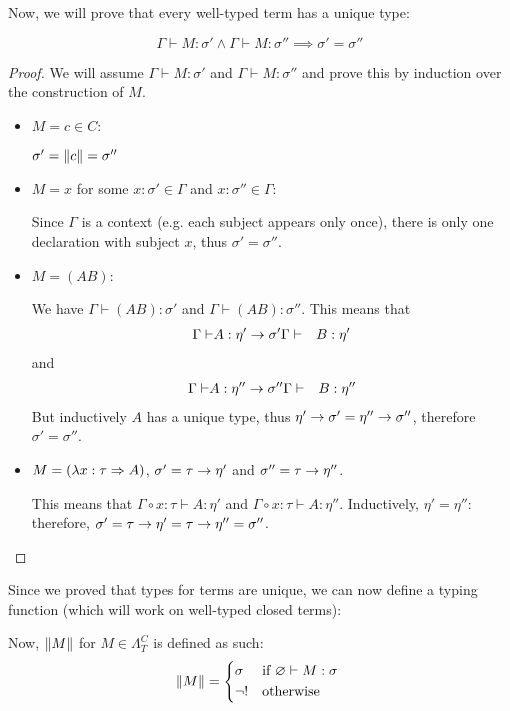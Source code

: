 \documentclass[main.tex]{subfiles}
\begin{document}
Now, we will prove that every well-typed term has a unique type:
\begin{prop}
    \label{prop:uniquetypespure}
    \[ \Gamma \vdash M : \sigma' \land \Gamma \vdash M : \sigma''
        \implies \sigma' = \sigma'' \]
\end{prop}
\begin{proof}
    We will assume $\Gamma \vdash M : \sigma'$ and $\Gamma \vdash M : \sigma''$
    and prove this by induction over the construction of $M$.

    \begin{itemize}
        \item $M = c \in C$:

            $\sigma' = \|c\| = \sigma''$

        \item $M = x$ for some $x : \sigma' \in \Gamma$ and $x : \sigma'' \in \Gamma$:

            Since $\Gamma$ is a context (e.g. each subject appears only once),
            there is only one declaration with subject $x$, thus $\sigma' = \sigma''$.

        \item $M = (AB)$:

            We have $\Gamma \vdash (AB) : \sigma'$ and $\Gamma \vdash (AB) : \sigma''$.
            This means that
            \begin{align*}
                \Gamma \vdash& A : \eta' \rightarrow \sigma'
                \Gamma \vdash& B : \eta'
            \end{align*}
            and
            \begin{align*}
                \Gamma \vdash& A : \eta'' \rightarrow \sigma''
                \Gamma \vdash& B : \eta''
            \end{align*}
            But inductively $A$ has a unique type, thus $\eta' \rightarrow \sigma'
            = \eta'' \rightarrow \sigma''$, therefore $\sigma' = \sigma''$.

        \item $M = (\lambda x : \tau \Rightarrow A)$, $\sigma' = \tau \rightarrow \eta'$
            and $\sigma'' = \tau \rightarrow \eta''$.

            This means that $\Gamma \circ x : \tau \vdash A : \eta'$ and
            $\Gamma \circ x : \tau \vdash A : \eta''$. Inductively, $\eta'
            = \eta''$: therefore, $\sigma' = \tau \rightarrow \eta' = \tau \rightarrow \eta''
            = \sigma''$.
    \end{itemize}
\end{proof}

Since we proved that types for terms are unique, we can now define a typing
function (which will work on well-typed closed terms):
\begin{defn}
    Now, $\|M\|$ for $M \in \Lambda_T^C$ is defined as such:
    \[
        \typeof{M} =
        \begin{cases*}
            \sigma & if $\varnothing \vdash M : \sigma$ \\
            \neg ! & otherwise
        \end{cases*}
    \]
\end{defn}
\end{document}
